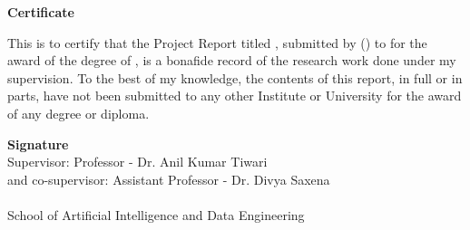 \begin{flushright}
\huge{\textbf{Certificate}}
\end{flushright}

\vspace{0.5cm}

This is to certify that the Project Report titled \textbf{\ttitle}, submitted by \authorname{} (\rn{}) to \univname{} for the award of the degree of \degree{}, is a bonafide record of the research work done under my supervision. To the best of my knowledge, the contents of this report, in full or in parts, have not been submitted to any other Institute or University for the award of any degree or diploma.

\vspace{3cm}

\begin{flushright}
\large{\textbf{Signature}}\\[0.5cm]
Supervisor: Professor - Dr. Anil Kumar Tiwari\\ and co-supervisor: Assistant Professor - Dr. Divya Saxena\\
\\
School of Artificial Intelligence and Data Engineering
\end{flushright}